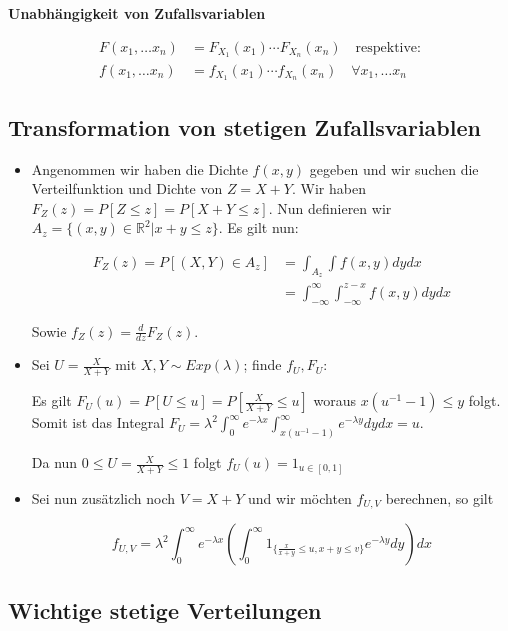 \documentclass[25pt]{sciposter}
\newcommand{\R}{\mathbb{R}}
\newenvironment{method}[1]{\begin{mdframed}[backgroundcolor=blue!10,innertopmargin=15pt, innerbottommargin=15pt,nobreak=true]
		\textbf{#1 }
	}
	{ 
	\end{mdframed}
}
\begin{document}
\begin{multicols}{3}
\begin{method}{Unabhängigkeit von Zufallsvariablen}
			\begin{align*}
				F(x_1,\ldots x_n) &= F_{X_1}(x_1) \cdots F_{X_n}(x_n) \quad \text{respektive:}\\
				f(x_1,\ldots x_n) &= f_{X_1}(x_1) \cdots f_{X_n}(x_n) \quad \forall x_1,\ldots x_n
			\end{align*}
		\end{method}
		
		
		\subsection*{Transformation von stetigen Zufallsvariablen}
		\begin{itemize}
			\item Angenommen wir haben die Dichte $f(x,y)$ gegeben und wir suchen die Verteilfunktion und Dichte von $Z = X + Y$. Wir haben $F_Z(z) = P[Z \leq z] = P[X+Y\leq z]$. Nun definieren wir $A_z = \{(x,y)\in\R^2|x+y\leq z\}$. Es gilt nun:
			
			\begin{align*}
				F_Z(z) = P[(X,Y)\in A_z] &= \int_{A_z} \int f(x,y) dy dx\\
				&= \int_{-\infty}^{\infty} \int_{-\infty}^{z-x} f(x,y) dy dx
			\end{align*}
			
			Sowie $f_Z(z) = \frac{d}{dz} F_Z(z)$.
			
			
			\item Sei $U = \frac{X}{X+Y}$ mit $X,Y\sim Exp(\lambda)$; finde $f_U, F_U$:
			
			Es gilt $F_U(u) = P[U \leq u] = P[\frac{X}{X+Y}\leq u]$ woraus $x(u^{-1} -1)\leq y$ folgt.
			Somit ist das Integral $F_U = \lambda^2 \int_{0}^{\infty} e^{-\lambda x} \int_{x(u^{-1} -1)}^{\infty} e^{-\lambda y} dy dx = u$.
			
			Da nun $0 \leq U = \frac{X}{X+Y} \leq 1$ folgt $f_U(u) = 1_{u\in[0,1]}$
			
			\item Sei nun zusätzlich noch $V=X+Y$ und wir möchten $f_{U,V}$ berechnen, so gilt
			
			$$f_{U,V} = \lambda^2 \int_{0}^{\infty} e^{-\lambda x} \left(\int_{0}^{\infty} 1_{\{\frac{x}{x+y}\leq u, x+y \leq v\}} e^{-\lambda y}dy \right) dx$$
			
		\end{itemize}
		
		
		
		
		
		\subsection*{Wichtige stetige Verteilungen}
		

\end{multicols}
\end{document}
